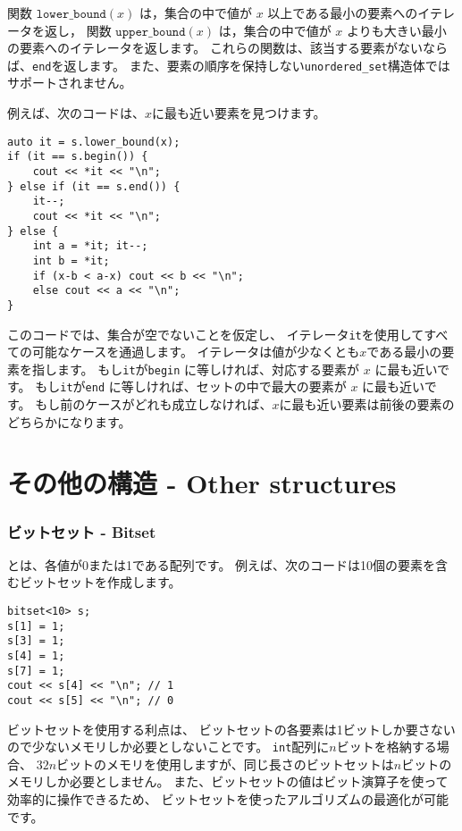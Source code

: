 関数 $\texttt{lower\_bound}(x)$ は，集合の中で値が $x$ 以上である最小の要素へのイテレータを返し，
関数 $\texttt{upper\_bound}(x)$ は，集合の中で値が $x$ よりも大きい最小の要素へのイテレータを返します。
これらの関数は、該当する要素がないならば、\texttt{end}を返します。
また、要素の順序を保持しない\texttt{unordered\_set}構造体ではサポートされません。

\begin{samepage}
例えば、次のコードは、$x$に最も近い要素を見つけます。
\begin{lstlisting}
auto it = s.lower_bound(x);
if (it == s.begin()) {
    cout << *it << "\n";
} else if (it == s.end()) {
    it--;
    cout << *it << "\n";
} else {
    int a = *it; it--;
    int b = *it;
    if (x-b < a-x) cout << b << "\n";
    else cout << a << "\n";
}
\end{lstlisting}

このコードでは、集合が空でないことを仮定し、
イテレータ\texttt{it}を使用してすべての可能なケースを通過します。
イテレータは値が少なくとも$x$である最小の要素を指します。
もし\texttt{it}が\texttt{begin} に等しければ、対応する要素が $x$ に最も近いです。
もし\texttt{it}が\texttt{end} に等しければ、セットの中で最大の要素が $x$ に最も近いです。
もし前のケースがどれも成立しなければ、$x$に最も近い要素は前後の要素のどちらかになります。
\end{samepage}

\section{その他の構造 - Other structures}

\subsubsection{ビットセット - Bitset}


 とは、各値が0または1である配列です。
例えば、次のコードは10個の要素を含むビットセットを作成します。
\begin{lstlisting}
bitset<10> s;
s[1] = 1;
s[3] = 1;
s[4] = 1;
s[7] = 1;
cout << s[4] << "\n"; // 1
cout << s[5] << "\n"; // 0
\end{lstlisting}

ビットセットを使用する利点は、
ビットセットの各要素は1ビットしか要さないので少ないメモリしか必要としないことです。
\texttt{int}配列に$n$ビットを格納する場合、
$32n$ビットのメモリを使用しますが、同じ長さのビットセットは$n$ビットのメモリしか必要としません。
また、ビットセットの値はビット演算子を使って効率的に操作できるため、
ビットセットを使ったアルゴリズムの最適化が可能です。

